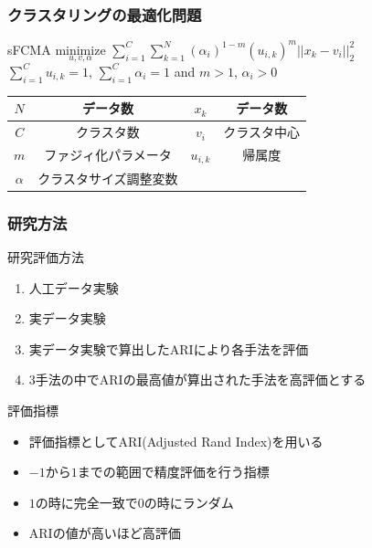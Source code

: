 \documentclass[13pt,dvipdfmx]{beamer}
\begin{document}
\begin{frame}\frametitle{クラスタリングの最適化問題}
  \begin{block}{sFCMA}
    \quad$\underset{u,v,\alpha}{\text{minimize}}$
    $\sum_{i=1}^C\sum_{k=1}^N(\alpha_{i})^{1-m}(u_{i,k})^m||x_k-v_i||_2^2$\\
    \qquad\qquad{}$\sum_{i=1}^Cu_{i,k}=1$\;, \;$\sum_{i=1}^C\alpha_{i}=1$\; and \;$m>1$\;, \;$\alpha_{i}>0$
  \end{block}
  \begin{center}
    \begin{tabular}{c|c||c|c} \hline
	  {$N$}&データ数&{$x_k$}&データ数 \\ \hline
	  {$C$}&クラスタ数&{$v_i$}&クラスタ中心\\ \hline
	  {$m$}&ファジィ化パラメータ&{$u_{i,k}$}&帰属度 \\ \hline
	  {$\alpha$}&クラスタサイズ調整変数\\ \hline
    \end{tabular}
  \end{center}
\end{frame}

\begin{frame}\frametitle{研究方法}
 \begin{block}{研究評価方法}
   \begin{enumerate}
    \item 人工データ実験
    \item 実データ実験
    \item 実データ実験で算出したARIにより各手法を評価
    \item 3手法の中でARIの最高値が算出された手法を高評価とする
   \end{enumerate}
 \end{block}
 \begin{block}{評価指標}
  \begin{itemize}
   \item 評価指標としてARI(Adjusted Rand Index)を用いる
   \item $-1$から$1$までの範囲で精度評価を行う指標
   \item $1$の時に完全一致で$0$の時にランダム
   \item ARIの値が高いほど高評価
  \end{itemize}
 \end{block}
\end{frame}
\end{document}
